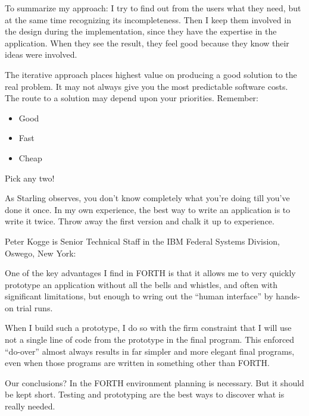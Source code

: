 \begin{tfquot}
\noindent To summarize my approach: I try to find out from the users what they
need, but at the same time recognizing its incompleteness. Then I keep
them involved in the design during the implementation, since they have the
expertise in the application.
When they see the result, they feel good because they know their ideas were
involved.

\noindent The iterative approach places highest value on producing a good solution to
the real problem. It may not always give you the most predictable software
costs. The route to a solution may depend upon your priorities. Remember:

\begin{itemize}
\item Good
\item Fast
\item Cheap
\end{itemize}

\noindent Pick any two!
\end{tfquot}
\blackline{1ex}

\noindent As Starling observes, you don't know completely what you're doing till
you've done it once. In my own experience, the best way to write an
application is to write it twice. Throw away the first version and chalk it up
to experience.

\bigskip\blackline{2ex}
\noindent Peter Kogge is Senior Technical Staff in the IBM Federal Systems
Division, Oswego, New York:

\begin{tfquot}
\noindent One of the key advantages I find in FORTH is that it allows me to very
quickly prototype an application without all the bells and whistles, and
often with significant limitations, but enough to wring out the ``human
interface'' by hands-on trial runs.

When I build such a prototype, I do so with the firm constraint that I will
use not a single line of code from the prototype in the final program. This
enforced ``do-over'' almost always results in far simpler and more elegant
final programs, even when those programs are written in something other
than FORTH.
\end{tfquot}
\blackline{1ex}

\noindent Our conclusions? In the FORTH environment planning is necessary. But
it should be kept short. Testing and prototyping are the best ways to
discover what is really needed.

